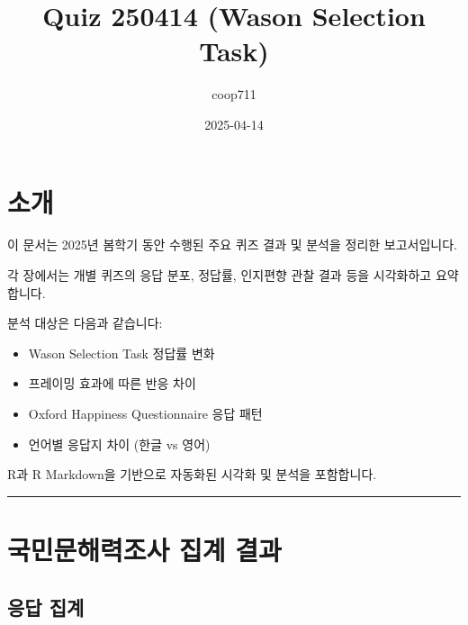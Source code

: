 \documentclass[
]{book}
\title{Quiz 250414 (Wason Selection Task)}
\author{coop711}
\date{2025-04-14}
\providecommand{\tightlist}{%
  \setlength{\itemsep}{0pt}\setlength{\parskip}{0pt}}
\begin{document}
\maketitle

{
\setcounter{tocdepth}{1}
\tableofcontents
}
\chapter{소개}\label{uxc18cuxac1c}

이 문서는 2025년 봄학기 동안 수행된 주요 퀴즈 결과 및 분석을 정리한 보고서입니다.

각 장에서는 개별 퀴즈의 응답 분포, 정답률, 인지편향 관찰 결과 등을 시각화하고 요약합니다.

분석 대상은 다음과 같습니다:

\begin{itemize}
\tightlist
\item
  Wason Selection Task 정답률 변화
\item
  프레이밍 효과에 따른 반응 차이
\item
  Oxford Happiness Questionnaire 응답 패턴
\item
  언어별 응답지 차이 (한글 vs 영어)
\end{itemize}

R과 R Markdown을 기반으로 자동화된 시각화 및 분석을 포함합니다.

\begin{center}\rule{0.5\linewidth}{0.5pt}\end{center}

\chapter{국민문해력조사 집계 결과}\label{uxad6duxbbfcuxbb38uxd574uxb825uxc870uxc0ac-uxc9d1uxacc4-uxacb0uxacfc}

\section{응답 집계}\label{uxc751uxb2f5-uxc9d1uxacc4}
\end{document}
